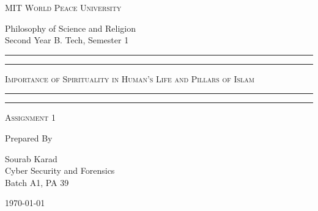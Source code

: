 \documentclass[11pt]{article}
\begin{document}
\begin{titlepage}
	\centering


	\huge\textsc{
		MIT World Peace University
	}\\

	\vspace{0.75\baselineskip} %

	\LARGE{
		Philosophy of Science and Religion\\
		Second Year B. Tech, Semester 1
	}

	\vfill %


	\rule{\textwidth}{1.6pt}\vspace*{-\baselineskip}\vspace*{2pt}
	\rule{\textwidth}{0.6pt}
	\vspace{0.75\baselineskip} %



	\huge{\textsc{
		Importance of Spirituality in Human's Life and Pillars of Islam
		}} \\



	\vspace{0.5\baselineskip} %
	\rule{\textwidth}{0.6pt}\vspace*{-\baselineskip}\vspace*{2.8pt}
	\rule{\textwidth}{1.6pt}

	\vspace{1\baselineskip} %


	\LARGE\textsc{
		Assignment 1
	} %
	\vfill


	Prepared By
	\vspace{0.5\baselineskip} %

	\Large{
		Sourab Karad \\
		Cyber Security and Forensics\\
		Batch A1, PA 39
	}


	\vspace{0.5\baselineskip} %
	\today
	
\end{titlepage}
\end{document}
